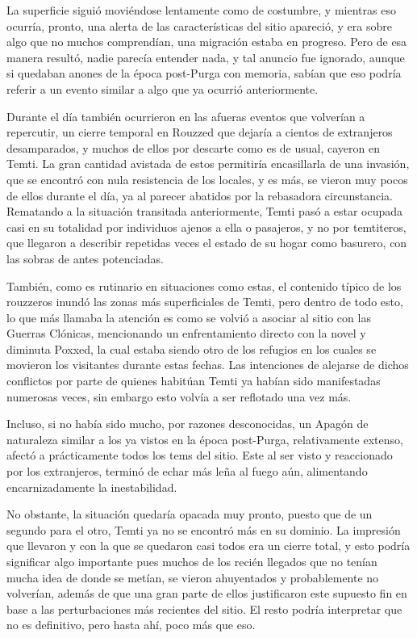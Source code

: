 \documentclass[
]{book}
\begin{document}
La superficie siguió moviéndose lentamente como de costumbre, y mientras eso ocurría, pronto, una alerta de las características del sitio apareció, y era sobre algo que no muchos comprendían, una migración estaba en progreso. Pero de esa manera resultó, nadie parecía entender nada, y tal anuncio fue ignorado, aunque si quedaban anones de la época post-Purga con memoria, sabían que eso podría referir a un evento similar a algo que ya ocurrió anteriormente.

Durante el día también ocurrieron en las afueras eventos que volverían a repercutir, un cierre temporal en Rouzzed que dejaría a cientos de extranjeros desamparados, y muchos de ellos por descarte como es de usual, cayeron en Temti. La gran cantidad avistada de estos permitiría encasillarla de una invasión, que se encontró con nula resistencia de los locales, y es más, se vieron muy pocos de ellos durante el día, ya al parecer abatidos por la rebasadora circunstancia. Rematando a la situación transitada anteriormente, Temti pasó a estar ocupada casi en su totalidad por individuos ajenos a ella o pasajeros, y no por temtiteros, que llegaron a describir repetidas veces el estado de su hogar como basurero, con las sobras de antes potenciadas.

También, como es rutinario en situaciones como estas, el contenido típico de los rouzzeros inundó las zonas más superficiales de Temti, pero dentro de todo esto, lo que más llamaba la atención es como se volvió a asociar al sitio con las Guerras Clónicas, mencionando un enfrentamiento directo con la novel y diminuta Poxxed, la cual estaba siendo otro de los refugios en los cuales se movieron los visitantes durante estas fechas. Las intenciones de alejarse de dichos conflictos por parte de quienes habitúan Temti ya habían sido manifestadas numerosas veces, sin embargo esto volvía a ser reflotado una vez más.

Incluso, si no había sido mucho, por razones desconocidas, un Apagón de naturaleza similar a los ya vistos en la época post-Purga, relativamente extenso, afectó a prácticamente todos los tems del sitio. Este al ser visto y reaccionado por los extranjeros, terminó de echar más leña al fuego aún, alimentando encarnizadamente la inestabilidad.

No obstante, la situación quedaría opacada muy pronto, puesto que de un segundo para el otro, Temti ya no se encontró más en su dominio. La impresión que llevaron y con la que se quedaron casi todos era un cierre total, y esto podría significar algo importante pues muchos de los recién llegados que no tenían mucha idea de donde se metían, se vieron ahuyentados y probablemente no volverían, además de que una gran parte de ellos justificaron este supuesto fin en base a las perturbaciones más recientes del sitio. El resto podría interpretar que no es definitivo, pero hasta ahí, poco más que eso.
\end{document}

